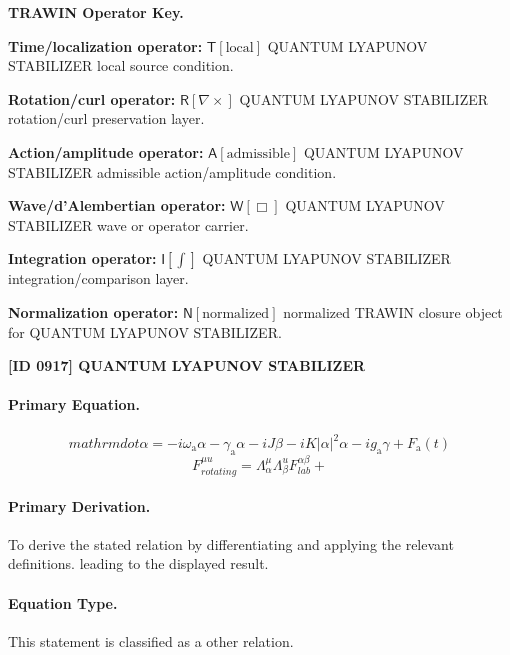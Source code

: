 \par\vspace{0.45\baselineskip}
\noindent\begin{minipage}[t]{\linewidth}
\begingroup
\small
\raggedright
\textbf{TRAWIN Operator Key.}\par
\noindent\textbf{Time/localization operator:} $\mathsf{T}\!\left[\mathrm{local}\right]$ QUANTUM LYAPUNOV STABILIZER local source condition.\par
\noindent\textbf{Rotation/curl operator:} $\mathsf{R}\!\left[\nabla\times\right]$ QUANTUM LYAPUNOV STABILIZER rotation/curl preservation layer.\par
\noindent\textbf{Action/amplitude operator:} $\mathsf{A}\!\left[\mathrm{admissible}\right]$ QUANTUM LYAPUNOV STABILIZER admissible action/amplitude condition.\par
\noindent\textbf{Wave/d'Alembertian operator:} $\mathsf{W}\!\left[\Box\right]$ QUANTUM LYAPUNOV STABILIZER wave or operator carrier.\par
\noindent\textbf{Integration operator:} $\mathsf{I}\!\left[\int\right]$ QUANTUM LYAPUNOV STABILIZER integration/comparison layer.\par
\noindent\textbf{Normalization operator:} $\mathsf{N}\!\left[\mathrm{normalized}\right]$ normalized TRAWIN closure object for QUANTUM LYAPUNOV STABILIZER.\par
\endgroup
\end{minipage}

\clearpage
\noindent\textbf{[ID 0917] QUANTUM LYAPUNOV STABILIZER}\par
\vspace{0.35em}
\paragraph{Primary Equation.}
\[
mathrm{dot}{\alpha} = -i\omega_{\mathrm{a}} \alpha - \gamma_{\mathrm{a}} \alpha - iJ\beta - iK|\alpha|^2\alpha - i g_{\mathrm{a}} \gamma + F_{\mathrm{a}}(t)
\]
\[
F_{rotating}^{\mu u}=\Lambda_{\alpha}^{\mu}\Lambda_{\beta}^{ u}F_{lab}^{\alpha\beta}+
\]

\paragraph{Primary Derivation.}
To derive the stated relation by differentiating and applying the relevant definitions. leading to the displayed result.
\paragraph{Equation Type.}
This statement is classified as a other relation.

